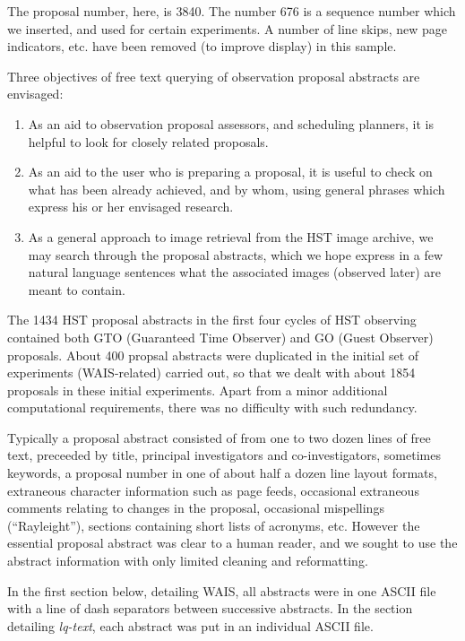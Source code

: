 The proposal number, here, is 3840.  The number 676 is a sequence number which
we inserted, and used for certain experiments.  A number of line skips, 
new page indicators, etc. have been removed (to improve display) in this 
sample.  

Three objectives of free text querying of 
observation proposal abstracts are envisaged:

\begin{enumerate}

\item As an aid to observation proposal assessors, and scheduling planners,
it is helpful to look for closely related proposals.

\item As an aid to the user who is preparing a proposal, it is useful to
check on what has been already achieved, and by whom, using general phrases
which express his or her envisaged research.

\item As a general approach to image retrieval from the HST image archive,
we may search through the proposal abstracts, which we hope express in a 
few natural language sentences what the associated images (observed later)
are meant to contain.

\end{enumerate}

The 1434 HST proposal abstracts in the first four cycles of HST observing 
contained both GTO (Guaranteed Time Observer) and GO (Guest Observer) 
proposals.  About 400 propsal abstracts were duplicated in
the initial set of experiments (WAIS-related) carried out, so that we
dealt with about 1854 proposals in these initial experiments.  
Apart from a minor 
additional computational requirements, there was no difficulty with
such redundancy. 

Typically a proposal abstract consisted of from one to two 
dozen lines of free text, 
preceeded by title, principal investigators and co-investigators, 
sometimes keywords, a proposal number in 
one of about half a dozen line layout formats, extraneous character 
information such as
page feeds, occasional extraneous comments relating to changes in the 
proposal, occasional mispellings (``Rayleight''), sections containing 
short lists of acronyms, etc.  However the essential
proposal abstract was clear to a human reader, and we sought to use the
abstract information with only limited cleaning and reformatting.

In the first section below, detailing WAIS, all abstracts were in one ASCII 
file
with a line of dash separators between successive abstracts.  In the section
detailing {\it lq-text}, each abstract was put in an individual 
ASCII file.

